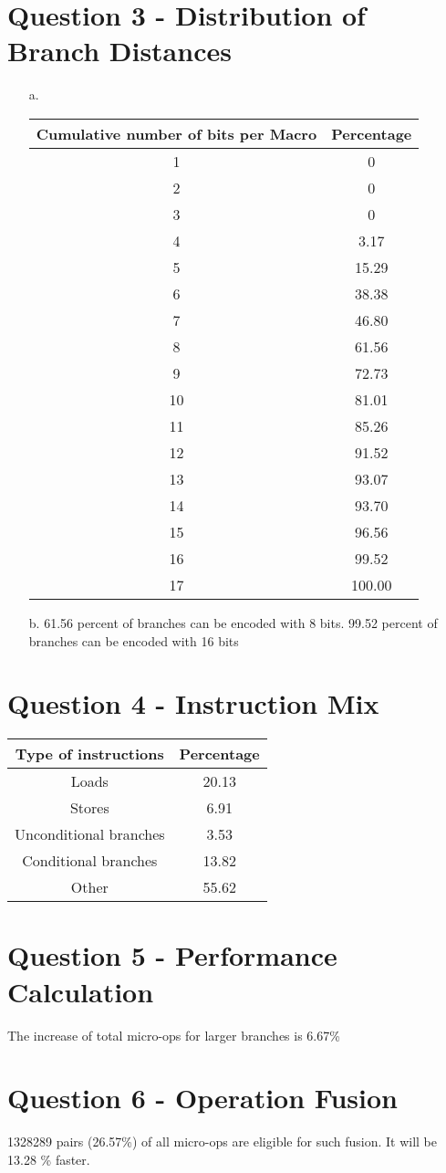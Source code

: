 \documentclass[12pt,letterpaper]{article}
\begin{document}
 \section*{Question 3 - Distribution of Branch Distances}
 \begin{itemize}
     \item[a.] 
     \begin{tabular}{|c|c|}
\hline 
Cumulative number of bits per Macro & Percentage \\ 
\hline 
1 & 0 \\ 
\hline 
2 & 0 \\ 
\hline 
3 & 0 \\ 
\hline 
4 & 3.17 \\ 
\hline 
5 & 15.29 \\ 
\hline 
6 & 38.38 \\ 
\hline 
7 & 46.80 \\ 
\hline 
8 & 61.56 \\ 
\hline 
9 & 72.73 \\ 
\hline 
10 & 81.01 \\ 
\hline 
11 & 85.26 \\ 
\hline 
12 & 91.52 \\ 
\hline 
13 & 93.07 \\ 
\hline 
14 & 93.70 \\ 
\hline 
15 & 96.56 \\ 
\hline 
16 & 99.52 \\ 
\hline 
17 & 100.00 \\ 
\hline 
\end{tabular} 
    \item[b.] 61.56 percent of branches can be encoded with 8 bits. 
    99.52 percent of branches can be encoded with 16 bits
 \end{itemize}
 \section*{Question 4 - Instruction Mix}
 \begin{tabular}{|c|c|}
\hline 
Type of instructions & Percentage \\ 
\hline 
Loads & 20.13 \\ 
\hline 
Stores & 6.91 \\ 
\hline 
Unconditional branches & 3.53 \\ 
\hline 
Conditional branches & 13.82 \\ 
\hline 
Other & 55.62 \\ 
\hline 
\end{tabular} 
 \section*{Question 5 - Performance Calculation}
 The increase of total micro-ops for larger branches is 6.67\%
 \section*{Question 6 - Operation Fusion}
 1328289 pairs (26.57\%) of all micro-ops are eligible for such fusion.
It will be 13.28 \% faster.
\end{document}
